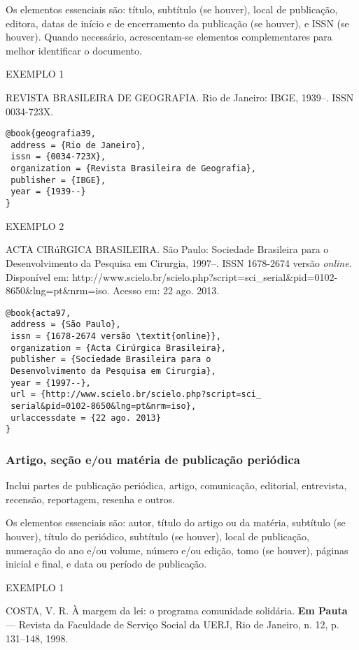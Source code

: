Os elementos essenciais são: título, subtítulo (se houver), local de publicação, editora, datas de início e de encerramento da publicação (se houver), e ISSN (se houver). Quando necessário, acrescentam-se elementos complementares para melhor identificar o documento.

EXEMPLO 1 

REVISTA BRASILEIRA DE GEOGRAFIA. Rio de Janeiro: IBGE, 1939--. ISSN 0034-723X.

\begin{verbatim}
@book{geografia39,
 address = {Rio de Janeiro},
 issn = {0034-723X},
 organization = {Revista Brasileira de Geografia},
 publisher = {IBGE},
 year = {1939--}
}
\end{verbatim}

EXEMPLO 2 

ACTA CIRúRGICA BRASILEIRA. São Paulo: Sociedade Brasileira para o Desenvolvimento da Pesquisa em Cirurgia, 1997–. ISSN 1678-2674 versão \textit{online}. Disponível em: http://www.scielo.br/scielo.php?script=sci\_serial\&pid=0102-8650\&lng=pt\&nrm=iso. Acesso em: 22 ago. 2013.

\begin{verbatim}
@book{acta97,
 address = {São Paulo},
 issn = {1678-2674 versão \textit{online}},
 organization = {Acta Cirúrgica Brasileira},
 publisher = {Sociedade Brasileira para o 
 Desenvolvimento da Pesquisa em Cirurgia},
 year = {1997--},
 url = {http://www.scielo.br/scielo.php?script=sci_
 serial&pid=0102-8650&lng=pt&nrm=iso},
 urlaccessdate = {22 ago. 2013}
}
\end{verbatim}

\subsubsection{Artigo, seção e/ou matéria de publicação periódica}

Inclui partes de publicação periódica, artigo, comunicação, editorial, entrevista, recensão, reportagem, resenha e outros.

Os elementos essenciais são: autor, título do artigo ou da matéria, subtítulo (se houver), título do periódico, subtítulo (se houver), local de publicação, numeração do ano e/ou volume, número e/ou edição, tomo (se houver), páginas inicial e final, e data ou período de publicação.

EXEMPLO 1

COSTA, V. R. À margem da lei: o programa comunidade solidária. \textbf{Em Pauta} — Revista da Faculdade de Serviço Social da UERJ, Rio de Janeiro, n. 12, p. 131–148, 1998.


